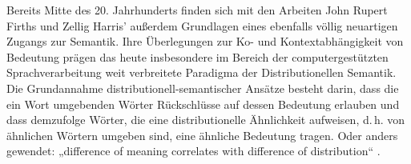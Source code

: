 Bereits Mitte des 20. Jahrhunderts finden sich mit den Arbeiten John Rupert Firths und Zellig Harris' außerdem Grundlagen eines ebenfalls völlig neuartigen Zugangs zur Semantik. Ihre Überlegungen zur Ko- und Kontextabhängigkeit von Bedeutung prägen das heute insbesondere im Bereich der computergestützten Sprachverarbeitung weit verbreitete Paradigma der Distributionellen Semantik. Die Grundannahme distributionell-semantischer Ansätze besteht darin, dass die ein Wort umgebenden Wörter Rückschlüsse auf dessen Bedeutung erlauben \autocite[„You shall know a word by the company it keeps.``][11]{firthSynopsisLinguisticTheory1957} und dass demzufolge Wörter, die eine distributionelle Ähnlichkeit aufweisen, d.\,h. von ähnlichen Wörtern umgeben sind, eine ähnliche Bedeutung tragen. Oder anders gewendet: „difference of meaning correlates with difference of distribution`` \autocite[156]{harrisDistributionalStructure1954}.

